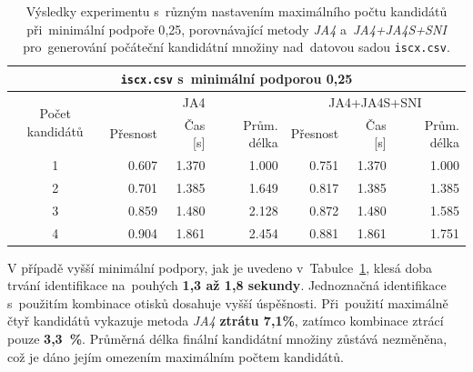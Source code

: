 \begin{table}[H]
	\centering
	\begin{tabular}{c|rrr|rrr}
		\toprule
		\multicolumn{7}{c}{\texttt{iscx.csv} s~minimální podporou 0{,}25}  \\
		\midrule
		\multirow{2}{*}{Počet kandidátů} & \multicolumn{3}{c}{JA4} & \multicolumn{3}{c}{JA4+JA4S+SNI}\\
		  & Přesnost & Čas [s] & Prům. délka & Přesnost & Čas [s] & Prům. délka \\
		\midrule
		1 & 0.607     & 1.370    & 1.000         & 0.751     & 1.370    & 1.000         \\
		2 & 0.701     & 1.385    & 1.649         & 0.817     & 1.385    & 1.385         \\
		3 & 0.859     & 1.480    & 2.128         & 0.872     & 1.480    & 1.585         \\
		4 & 0.904     & 1.861    & 2.454         & 0.881     & 1.861    & 1.751         \\
		\bottomrule
	\end{tabular}
	\caption{Výsledky experimentu s~různým nastavením maximálního počtu kandidátů při~minimální podpoře 0{,}25, porovnávající metody \textit{JA4} a~\textit{JA4+JA4S+SNI} pro~generování počáteční kandidátní množiny nad~datovou sadou \texttt{iscx.csv}.}
	\label{tab:iscx_sup_25}
\end{table}

V případě vyšší minimální podpory, jak je uvedeno v~Tabulce~\ref{tab:iscx_sup_25}, klesá doba trvání identifikace na~pouhých \textbf{1{,}3 až 1{,}8 sekundy}. Jednoznačná identifikace s~použitím kombinace otisků dosahuje vyšší úspěšnosti. Při~použití maximálně čtyř kandidátů vykazuje metoda \textit{JA4} \textbf{ztrátu 7{,}1\%}, zatímco kombinace ztrácí pouze \textbf{3{,}3~\%}. Průměrná délka finální kandidátní množiny zůstává nezměněna, což je dáno jejím omezením maximálním počtem kandidátů.

